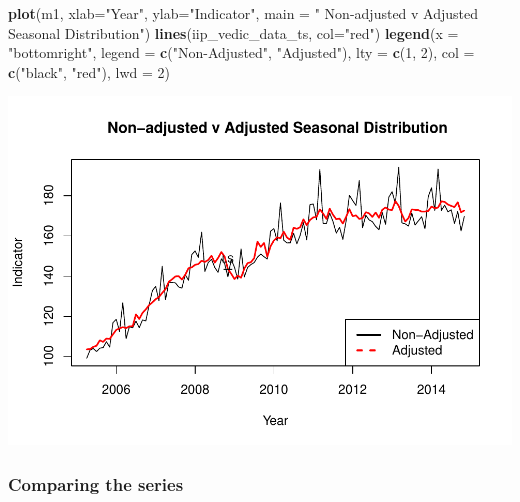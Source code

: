 \documentclass[
]{article}
\newenvironment{Shaded}{\begin{snugshade}}{\end{snugshade}}
\newcommand{\AttributeTok}[1]{\textcolor[rgb]{0.13,0.29,0.53}{#1}}
\newcommand{\DecValTok}[1]{\textcolor[rgb]{0.00,0.00,0.81}{#1}}
\newcommand{\FunctionTok}[1]{\textcolor[rgb]{0.13,0.29,0.53}{\textbf{#1}}}
\newcommand{\NormalTok}[1]{#1}
\newcommand{\StringTok}[1]{\textcolor[rgb]{0.31,0.60,0.02}{#1}}
\begin{document}
\begin{Shaded}
\begin{Highlighting}[]
\FunctionTok{plot}\NormalTok{(m1, }\AttributeTok{xlab=}\StringTok{"Year"}\NormalTok{, }\AttributeTok{ylab=}\StringTok{"Indicator"}\NormalTok{, }\AttributeTok{main =} \StringTok{" Non{-}adjusted v Adjusted Seasonal Distribution"}\NormalTok{)}
\FunctionTok{lines}\NormalTok{(iip\_vedic\_data\_ts, }\AttributeTok{col=}\StringTok{"red"}\NormalTok{)}
\FunctionTok{legend}\NormalTok{(}\AttributeTok{x =} \StringTok{"bottomright"}\NormalTok{,          }
       \AttributeTok{legend =} \FunctionTok{c}\NormalTok{(}\StringTok{"Non{-}Adjusted"}\NormalTok{, }\StringTok{"Adjusted"}\NormalTok{),}
       \AttributeTok{lty =} \FunctionTok{c}\NormalTok{(}\DecValTok{1}\NormalTok{, }\DecValTok{2}\NormalTok{),           }
       \AttributeTok{col =} \FunctionTok{c}\NormalTok{(}\StringTok{"black"}\NormalTok{, }\StringTok{"red"}\NormalTok{),}
       \AttributeTok{lwd =} \DecValTok{2}\NormalTok{)       }
\end{Highlighting}
\end{Shaded}

\includegraphics{regressors_of_diwali_seasonality_for_industrial_production_files/figure-latex/unnamed-chunk-10-1.pdf}

\hypertarget{comparing-the-series}{%
\subsubsection{Comparing the series}\label{comparing-the-series}}
\end{document}
